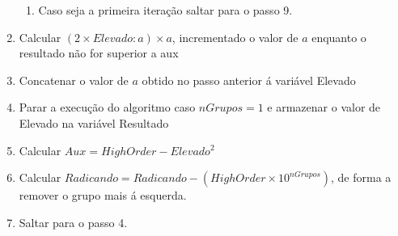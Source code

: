 \begin{enumerate}
\begin{enumerate}
		\item Caso seja a primeira iteração saltar para o passo 9.
	\end{enumerate}
	\item Calcular $(2\times Elevado:a)\times a$, incrementado o valor de $a$ enquanto o resultado não for superior a aux
	\item Concatenar o valor de $a$ obtido no passo anterior á variável Elevado
	\item Parar a execução do algoritmo caso $nGrupos = 1$ e armazenar o valor de Elevado na variável Resultado
	\item Calcular $Aux = HighOrder - Elevado^{2}$ 
	\item Calcular $Radicando = Radicando - (HighOrder\times 10^{nGrupos})$, de forma a remover o grupo mais á esquerda.
	\item Saltar para o passo 4.
\end{enumerate}

